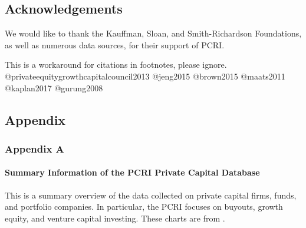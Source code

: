\documentclass[
]{WileySix}
\begin{document}
\hypertarget{acknowledgements-1}{%
\subsection*{Acknowledgements}\label{acknowledgements-1}}

We would like to thank the Kauffman, Sloan, and Smith-Richardson Foundations, as well as numerous data sources, for their support of PCRI.

\begin{invisible}
This is a workaround for citations in footnotes, please ignore.
@privateequitygrowthcapitalcouncil2013 @jeng2015 @brown2015 @maats2011
@kaplan2017 @gurung2008
\end{invisible}

\hypertarget{appendix-3}{%
\subsection*{Appendix}\label{appendix-3}}

\hypertarget{appendix-a-1}{%
\subsubsection*{Appendix A}\label{appendix-a-1}}

\hypertarget{summary-information-of-the-pcri-private-capital-database}{%
\paragraph{Summary Information of the PCRI Private Capital Database}\label{summary-information-of-the-pcri-private-capital-database}}

This is a summary overview of the data collected on private capital firms, funds, and portfolio companies. In particular, the PCRI focuses on buyouts, growth equity, and venture capital investing. These charts are from \citep{jeng2015}.
\end{document}
